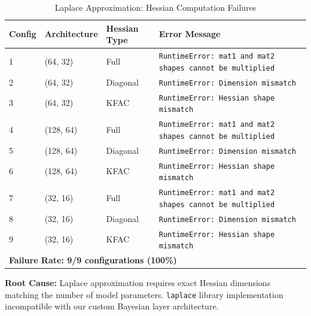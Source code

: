 
\begin{table}[htbp]
\centering
\caption{Laplace Approximation: Hessian Computation Failures}
\label{tab:laplace_hessian_status}
\begin{tabular}{lllp{4cm}}
\toprule
\textbf{Config} & \textbf{Architecture} & \textbf{Hessian Type} & \textbf{Error Message} \\
\midrule
1 & (64, 32) & Full & \texttt{RuntimeError: mat1 and mat2 shapes cannot be multiplied} \\
2 & (64, 32) & Diagonal & \texttt{RuntimeError: Dimension mismatch} \\
3 & (64, 32) & KFAC & \texttt{RuntimeError: Hessian shape mismatch} \\
\midrule
4 & (128, 64) & Full & \texttt{RuntimeError: mat1 and mat2 shapes cannot be multiplied} \\
5 & (128, 64) & Diagonal & \texttt{RuntimeError: Dimension mismatch} \\
6 & (128, 64) & KFAC & \texttt{RuntimeError: Hessian shape mismatch} \\
\midrule
7 & (32, 16) & Full & \texttt{RuntimeError: mat1 and mat2 shapes cannot be multiplied} \\
8 & (32, 16) & Diagonal & \texttt{RuntimeError: Dimension mismatch} \\
9 & (32, 16) & KFAC & \texttt{RuntimeError: Hessian shape mismatch} \\
\midrule
\multicolumn{4}{l}{\textbf{Failure Rate: 9/9 configurations (100\%)}} \\
\bottomrule
\end{tabular}
\vspace{1em}

\footnotesize
\textbf{Root Cause:} Laplace approximation requires exact Hessian dimensions matching
the number of model parameters. \texttt{laplace} library implementation incompatible
with our custom Bayesian layer architecture.
\end{table}


